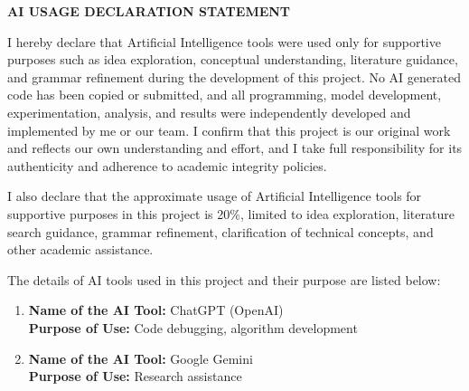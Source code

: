 \documentclass[12pt,a4paper]{report}
\begin{document}

\begin{titlepage}
\thispagestyle{plain}
\setcounter{page}{3}
\pagestyle{plain}

\begin{center}
{\fontsize{15}{18}\selectfont \textbf{AI USAGE DECLARATION STATEMENT}}
\end{center}

\vspace{0.2cm}

{\fontsize{11}{14}\selectfont
\begin{justify}

I hereby declare that Artificial Intelligence tools were used only for supportive purposes such as idea exploration, conceptual understanding, literature guidance, and grammar refinement during the development of this project. No AI generated code has been copied or submitted, and all programming, model development, experimentation, analysis, and results were independently developed and implemented by me or our team. I confirm that this project is our original work and reflects our own understanding and effort, and I take full responsibility for its authenticity and adherence to academic integrity policies.

\vspace{0.25cm}

I also declare that the approximate usage of Artificial Intelligence tools for supportive purposes in this project is 20\%, limited to idea exploration, literature search guidance, grammar refinement, clarification of technical concepts, and other academic assistance.

\vspace{0.25cm}

The details of AI tools used in this project and their purpose are listed below:

\vspace{0.1cm}

\begin{enumerate}[leftmargin=0.6cm,itemsep=0.15cm]

\item \textbf{Name of the AI Tool:} ChatGPT (OpenAI)\\
\textbf{Purpose of Use:} Code debugging, algorithm development

\item \textbf{Name of the AI Tool:} Google Gemini\\
\textbf{Purpose of Use:} Research assistance


\end{enumerate}
\end{justify}}
\end{titlepage}
\end{document}

